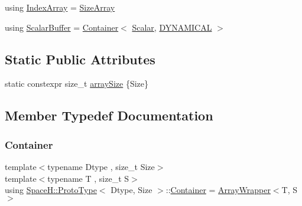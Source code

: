 \begin{DoxyCompactItemize}
\item 
using \mbox{\hyperlink{struct_space_h_1_1_proto_type_a276a37c81faf08681b57e8082f3f6c1b}{Index\+Array}} = \mbox{\hyperlink{struct_space_h_1_1_proto_type_abb1c3c7a06f24576cc47636441331972}{Size\+Array}}
\item 
using \mbox{\hyperlink{struct_space_h_1_1_proto_type_a62c491884996da10377d348a5aabad86}{Scalar\+Buffer}} = \mbox{\hyperlink{struct_space_h_1_1_proto_type_a60ee86c74f6f9ebfa78936f6dc1d2b07}{Container}}$<$ \mbox{\hyperlink{struct_space_h_1_1_proto_type_af3c8245d83d9db64749882920de5c274}{Scalar}}, \mbox{\hyperlink{namespace_space_h_a3e55b9bc2a9e10c08ce8121bce11244a}{D\+Y\+N\+A\+M\+I\+C\+AL}} $>$
\end{DoxyCompactItemize}
\subsection*{Static Public Attributes}
\begin{DoxyCompactItemize}
\item 
static constexpr size\+\_\+t \mbox{\hyperlink{struct_space_h_1_1_proto_type_a52e6df98534a97aa207f4447abd14d3c}{array\+Size}} \{Size\}
\end{DoxyCompactItemize}


\subsection{Member Typedef Documentation}
\mbox{\label{struct_space_h_1_1_proto_type_a60ee86c74f6f9ebfa78936f6dc1d2b07}} 
\subsubsection{\texorpdfstring{Container}{Container}}
{\footnotesize\ttfamily template$<$typename Dtype , size\+\_\+t Size$>$ \\
template$<$typename T , size\+\_\+t S$>$ \\
using \mbox{\hyperlink{struct_space_h_1_1_proto_type}{Space\+H\+::\+Proto\+Type}}$<$ Dtype, Size $>$\+::\mbox{\hyperlink{struct_space_h_1_1_proto_type_a60ee86c74f6f9ebfa78936f6dc1d2b07}{Container}} =  \mbox{\hyperlink{struct_space_h_1_1_array_wrapper}{Array\+Wrapper}}$<$T, S$>$}

\mbox{\label{struct_space_h_1_1_proto_type_a276a37c81faf08681b57e8082f3f6c1b}} 
